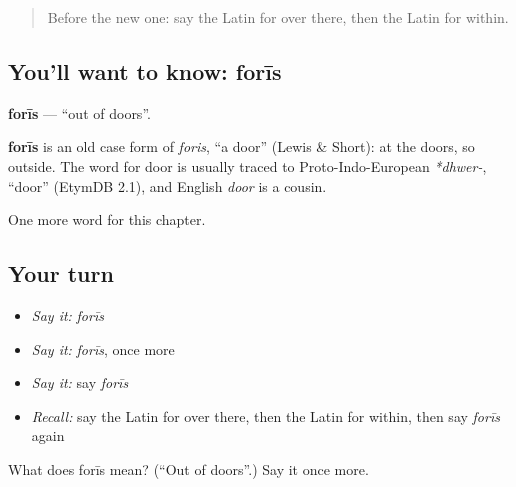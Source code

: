 \begin{quote}
Before the new one: say the Latin for over there, then the Latin for within.
\end{quote}

\subsection*{You'll want to know: forīs}
\textbf{forīs} — \textquotedblleft{}out of doors\textquotedblright{}.

\begin{cousinweb}
\textbf{forīs} is an old case form of \emph{foris}, \textquotedblleft{}a door\textquotedblright{} (Lewis \& Short): at the doors, so outside. The word for door is usually traced to Proto-Indo-European \emph{*dhwer-}, \textquotedblleft{}door\textquotedblright{} (EtymDB 2.1), and English \emph{door} is a cousin.
\end{cousinweb}

\begin{grammarlens}[title={What you've built}]
One more word for this chapter.
\end{grammarlens}

\subsection*{Your turn}
\begin{itemize}
\raggedright
  \item \emph{Say it:} \emph{forīs}
  \item \emph{Say it:} \emph{forīs}, once more
  \item \emph{Say it:} say \emph{forīs}
  \item \emph{Recall:} say the Latin for over there, then the Latin for within, then say \emph{forīs} again
\end{itemize}

\begin{tcolorbox}[breakable,colback=teal!4,colframe=teal!35!black,title={Before you move on}]
What does forīs mean? (\textquotedblleft{}Out of doors\textquotedblright{}.) Say it once more.
\end{tcolorbox}
